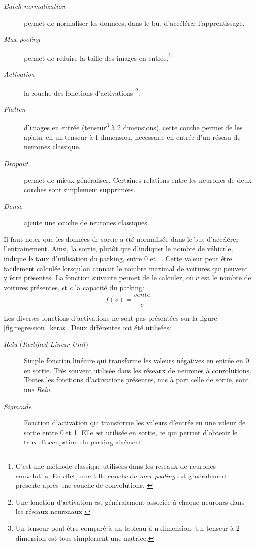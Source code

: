 \begin{description}
    \item[\textit{Batch normalization}] permet de normaliser les données, dans le but d'accélérer l'apprentissage.
    \item[\textit{Max pooling}] permet de réduire la taille des images en entrée.\footnote{C'est une méthode classique utilisées dans les réseaux de neurones convolutifs. En effet, une telle couche de \textit{max pooling} est généralement présente après une couche de convolutions. \autocite{wiki:CNN}} 
    \item[\textit{Activation}] la couche des fonctions d'activations \footnote{Une fonction d'activation est généralement associée à chaque neurones dans les réseaux neuronaux \autocite{wiki:NN}}. 
    \item[\textit{Flatten}] d'images en entrée (tenseur\footnote{Un tenseur peut être comparé à un tableau à n dimension. Un tenseur à 2 dimension est tous simplement une matrice. } à 2 dimensions), cette couche permet de les aplatir en un tenseur à 1 dimension, nécessaire en entrée d'un réseau de neurones classique.
    \item[\textit{Dropout}] permet de mieux généraliser. Certaines relations entre les neurones de deux couches sont simplement supprimées.
    \item[\textit{Dense}] ajoute une couche de neurones classiques. 
\end{description}

Il faut noter que les données de sortie a été normalisée dans le but d'accélérer l'entrainement. Ainsi, la sortie, plutôt que d'indiquer le nombre de véhicule, indique le taux d'utilisation du parking, entre $0$ et $1$. Cette valeur peut être facilement calculée lorsqu'on connait le nombre maximal de voitures qui peuvent y être présentes. La fonction suivante permet de le calculer, où $v$ est le nombre de voitures présentes, et $c$ la capacité du parking:
\[
    f(v) = \frac{vente}{c}
\]

Les diverses fonctions d'activations ne sont pas présentées sur la figure \ref{fig:regression_keras}. Deux différentes ont été utilisées:

\begin{description}
    \item[\textit{Relu} (\textit{Rectified Linear Unit})] Simple fonction linéaire qui transforme les valeurs négatives en entrée en $0$ en sortie. Très souvent utilisée dans les réseaux de neurones à convolutions. Toutes les fonctions d'activations présentes, mis à part celle de sortie, sont une \textit{Relu}.
    \item[\textit{Sigmoïde}] Fonction d'activation qui transforme les valeurs d'entrée en une valeur de sortie entre 0 et 1. Elle est utilisée en sortie, ce qui permet d'obtenir le taux d'occupation du parking aisément.
\end{description}

